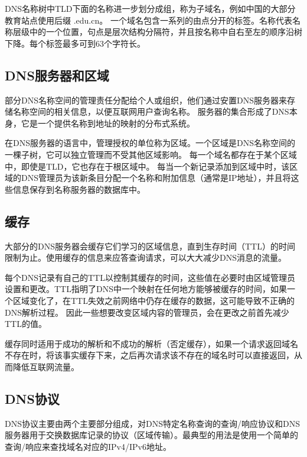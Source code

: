 \documentclass[]{article}
\begin{document}
        DNS名称树中TLD下面的名称进一步划分成组，称为子域名，例如中国的大部分教育站点使用后缀 .edu.cn。
        一个域名包含一系列的由点分开的标签。名称代表名称层级中的一个位置，句点是层次结构分隔符，并且按名称中自右至左的顺序沿树下降。每个标签最多可到63个字符长。
        
    \subsection{DNS服务器和区域}
        部分DNS名称空间的管理责任分配给个人或组织，他们通过安置DNS服务器来存储名称空间的相关信息，以便互联网用户查询名称。
        服务器的集合形成了DNS本身，它是一个提供名称到地址的映射的分布式系统。

        在DNS服务器的语言中，管理授权的单位称为区域。一个区域是DNS名称空间的一棵子树，它可以独立管理而不受其他区域影响。
        每一个域名都存在于某个区域中，即使是TLD，它也存在于根区域中。
        每当一个新记录添加到区域中时，该区域的DNS管理员为该新条目分配一个名称和附加信息（通常是IP地址），并且将这些信息保存到名称服务器的数据库中。

    \subsection{缓存}
        大部分的DNS服务器会缓存它们学习的区域信息，直到生存时间（TTL）的时间限制为止。使用缓存的信息来应答查询请求，可以大大减少DNS消息的流量。
        
        每个DNS记录有自己的TTL以控制其缓存的时间，这些值在必要时由区域管理员设置和更改。TTL指明了DNS中一个映射在任何地方能够被缓存的时间，如果一个区域变化了，在TTL失效之前网络中仍存在缓存的数据，这可能导致不正确的DNS解析过程。
        因此一些想要改变区域内容的管理员，会在更改之前首先减少TTL的值。

        缓存同时适用于成功的解析和不成功的解析（否定缓存），如果一个请求返回域名不存在时，将该事实缓存下来，之后再次请求该不存在的域名时可以直接返回，从而降低互联网流量。
    
    \subsection{DNS协议}
        DNS协议主要由两个主要部分组成，对DNS特定名称查询的查询/响应协议和DNS服务器用于交换数据库记录的协议（区域传输）。最典型的用法是使用一个简单的查询/响应来查找域名对应的IPv4/IPv6地址。
\end{document}
